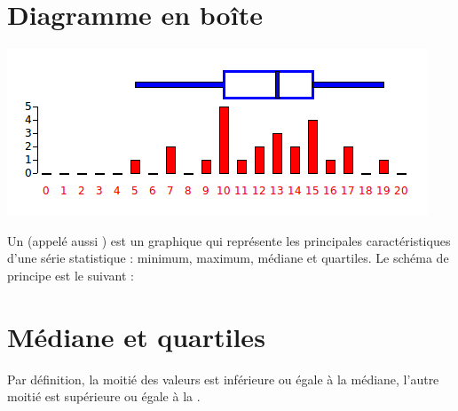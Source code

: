 \documentclass[11pt,class=report,crop=false]{standalone}
\begin{document}
\newpage

\section*{Diagramme en boîte}




\begin{center}
\includegraphics[scale=0.7]{ecran-stat-4}
\end{center}

Un  (appelé aussi ) est un graphique qui représente les principales caractéristiques d'une série statistique : minimum, maximum, médiane et quartiles. Le schéma de principe est le suivant :


\newpage



\section*{Médiane et quartiles}


 Par définition, la moitié des valeurs est inférieure ou égale à la médiane, l'autre moitié est supérieure ou égale à la .

\bigskip
\end{document}
